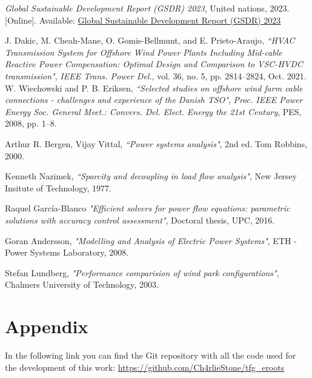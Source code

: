 \documentclass[a4paper,11pt, titlepage, twoside]{article}
\begin{document}
 \begin{thebibliography}{99}\label{biblio}
 

 \textit{Global Sustainable Development Report (GSDR) 2023}, United nations, 2023. [Online]. 
 Available: \href{https://sdgs.un.org/gsdr/gsdr2023}{Global Sustainable Development Report (GSDR) 2023}
 
 {J. Dakic, M. Cheah-Mane, O. Gomis-Bellmunt, and E. Prieto-Araujo},
\textit{“HVAC Transmission System for Offshore Wind Power Plants Including
 Mid-cable Reactive Power Compensation: Optimal Design and Comparison to VSC-HVDC transmission"}, \textit{IEEE Trans. Power Del.}, vol. 36,
 no. 5, pp. 2814–2824, Oct. 2021.
 {W. Wiechowski and P. B. Eriksen},
\textit{“Selected studies on offshore wind farm
cable connections - challenges and experience of the Danish TSO"}, \textit{Proc.
IEEE Power Energy Soc. General Meet.: Convers. Del. Elect. Energy the
21st Century}, PES, 2008, pp. 1–8.

 {Arthur R. Bergen, Vijay Vittal},
\textit{“Power systems analysis"}, 2nd ed. Tom Robbins, 2000.

{Kenneth Nazimek},
\textit{“Sparcity and decoupling in load flow analysis"}, New Jersey Insitute of Technology, 1977.

{ Raquel García-Blanco}
\textit{"Efficient solvers for power flow equations: parametric solutions with accuracy control assessment"}, Doctoral thesis, UPC, 2016.


{Goran Andersson},
\textit{"Modelling and Analysis of Electric Power Systems"}, ETH - Power Systems Laboratory, 2008.

{Stefan Lundberg},
\textit{"Performance comparision of wind park configurations"}, Chalmers University of Technology, 2003.




\end{thebibliography}
 
\section*{Appendix}\label{Appendix}

In the following link you can find the Git repository with all the code used for the development of this work:
\url{https://github.com/Ch4rlieStone/tfg_eroots}
 
\end{document}
